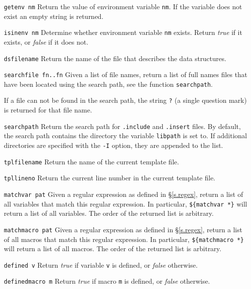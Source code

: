\begin{desctab}
\item[\texttt{getenv nm}]
Return the value of environment variable \texttt{nm}.
If the variable does not exist an empty string is returned.

\item[\texttt{isinenv nm}]
Determine whether environment variable \texttt{nm} exists.
Return \textit{true} if it exists, or \textit{false} \/if it does not.

\item[\texttt{dsfilename}]
Return the name of the file that describes the data structures.

\item[\texttt{searchfile fn..fn}]
Given a list of file names, return a list of full names files that
have been located using the search path, see the function
{\verb+searchpath+}.

If a file can not be found in the search path,
the string \verb+?+ (a single question mark) is returned for that
file name.

\item[\texttt{searchpath}]
Return the search path for \verb+.include+ and \verb+.insert+ files.
By default, the search path contains the directory the variable
\verb+libpath+ is set to.  If additional directories are specified
with the \verb+-I+ option, they are appended to the list.

\item[\texttt{tplfilename}]
Return the name of the current template file.

\item[\texttt{tpllineno}]
Return the current line number in the current template file.

\item[\texttt{matchvar pat}]
Given a regular expression as defined in \S\ref{s.regex},
return a list of all variables that match this regular expression.
In particular, \verb'${matchvar *}' will return a list of all
variables. The order of the returned list is arbitrary.

\item[\texttt{matchmacro pat}]
Given a regular expression as defined in \S\ref{s.regex},
return a list of all macros that match this regular expression.
In particular, \verb'${matchmacro *}' will return a list of all
macros. The order of the returned list is arbitrary.

\item[\texttt{defined v}]
Return \textit{true} if variable \texttt{v} is defined,
or \textit{false} otherwise.

\item[\texttt{definedmacro m}]
Return \textit{true} if macro \texttt{m} is defined,
or \textit{false} otherwise.
\end{desctab}

